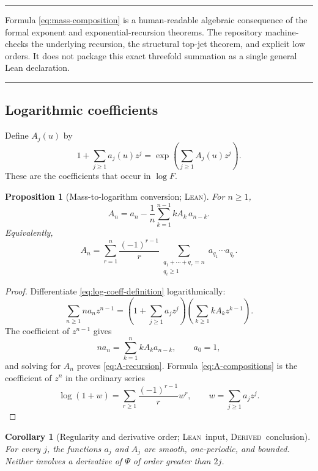 \documentclass[11pt,oneside]{article}
\newtheorem{proposition}[theorem]{Proposition}
\newtheorem{corollary}[theorem]{Corollary}
\theoremstyle{definition}
\theoremstyle{remark}
\newenvironment{boxedremark}{%
  \par\smallskip\noindent\begin{center}\begin{minipage}{0.94\textwidth}%
  \color{black}\hrule\vspace{0.6em}\small
}{%
  \vspace{0.6em}\hrule\end{minipage}\end{center}\smallskip
}
\newcommand{\Formalized}{\textsc{Lean}}
\newcommand{\Derived}{\textsc{Derived}}
\begin{document}
\begin{boxedremark}
Formula \eqref{eq:mass-composition} is a human-readable algebraic
consequence of the formal exponent and exponential-recursion theorems.
The repository machine-checks the underlying recursion, the structural
top-jet theorem, and explicit low orders.  It does not package this exact
threefold summation as a single general Lean declaration.
\end{boxedremark}

\subsection{Logarithmic coefficients}

Define $A_j(u)$ by
\begin{equation}
 1+\sum_{j\geq1}a_j(u)z^j
 =\exp\!\left(\sum_{j\geq1}A_j(u)z^j\right).
 \label{eq:log-coeff-definition}
\end{equation}
These are the coefficients that occur in $\log F$.

\begin{proposition}[Mass-to-logarithm conversion; \Formalized]
\label{prop:log-recursion}
For $n\geq1$,
\begin{equation}
 A_n
 =a_n-\frac1n\sum_{k=1}^{n-1}kA_k\,a_{n-k}.
 \label{eq:A-recursion}
\end{equation}
Equivalently,
\begin{equation}
 A_n
 =\sum_{r=1}^n\frac{(-1)^{r-1}}r
   \sum_{\substack{q_1+\cdots+q_r=n\\q_i\geq1}}
   a_{q_1}\cdots a_{q_r}. \label{eq:A-compositions}
\end{equation}
\end{proposition}

\begin{proof}
Differentiate \eqref{eq:log-coeff-definition} logarithmically:
\[
 \sum_{n\geq1}na_nz^{n-1}
 =
 \left(1+\sum_{j\geq1}a_jz^j\right)
 \left(\sum_{k\geq1}kA_kz^{k-1}\right).
\]
The coefficient of $z^{n-1}$ gives
\[
 na_n=\sum_{k=1}^n kA_ka_{n-k},
 \qquad a_0=1,
\]
and solving for $A_n$ proves \eqref{eq:A-recursion}.  Formula
\eqref{eq:A-compositions} is the coefficient of $z^n$ in the ordinary
series
\[
 \log(1+w)=\sum_{r\geq1}\frac{(-1)^{r-1}}r w^r,
 \qquad w=\sum_{j\geq1}a_jz^j.
\]
\end{proof}

\begin{corollary}[Regularity and derivative order; \Formalized\ input,
\Derived\ conclusion]
\label{cor:A-structure}
For every $j$, the functions $a_j$ and $A_j$ are smooth, one-periodic,
and bounded.  Neither involves a derivative of $\Psi$ of order greater
than $2j$.
\end{corollary}
\end{document}
